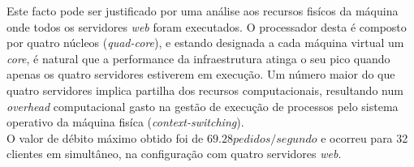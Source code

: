 Este facto pode ser justificado por uma análise aos recursos fisícos da máquina onde todos os servidores \textit{web} foram executados.
O processador desta é composto por quatro núcleos (\textit{quad-core}), e estando designada a cada máquina virtual um \textit{core}, é natural que a performance da infraestrutura atinga o seu pico quando apenas os quatro servidores estiverem em execução.
Um número maior do que quatro servidores implica partilha dos recursos computacionais, resultando num \textit{overhead} computacional gasto na gestão de execução de processos pelo sistema operativo da máquina fisíca (\textit{context-switching}). \\

O valor de débito máximo obtido foi de $69.28 pedidos/segundo$ e ocorreu para 32 clientes em simultâneo, na configuração com quatro servidores \textit{web}.
